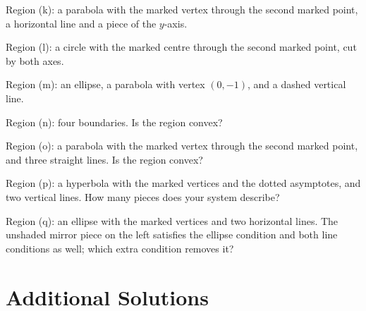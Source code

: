 \begin{gallery}
\hfill
{}\hfill\null
{}
\end{gallery}

\begin{problems}[resume]
  \item Region (k): a parabola with the marked vertex through the second
        marked point, a horizontal line and a piece of the $y$-axis.
  \item Region (l): a circle with the marked centre through the second
        marked point, cut by both axes.
  \item Region (m): an ellipse, a parabola with vertex $(0,-1)$, and a
        dashed vertical line.
  \item Region (n): four boundaries. Is the region convex?
  \item Region (o): a parabola with the marked vertex through the second
        marked point, and three straight lines. Is the region convex?
  \item Region (p): a hyperbola with the marked vertices and the dotted
        asymptotes, and two vertical lines. How many pieces does your
        system describe?
  \item Region (q): an ellipse with the marked vertices and two horizontal
        lines. The unshaded mirror piece on the left satisfies the ellipse
        condition and both line conditions as well; which extra condition
        removes it?
\end{problems}

\section{Additional Solutions}

